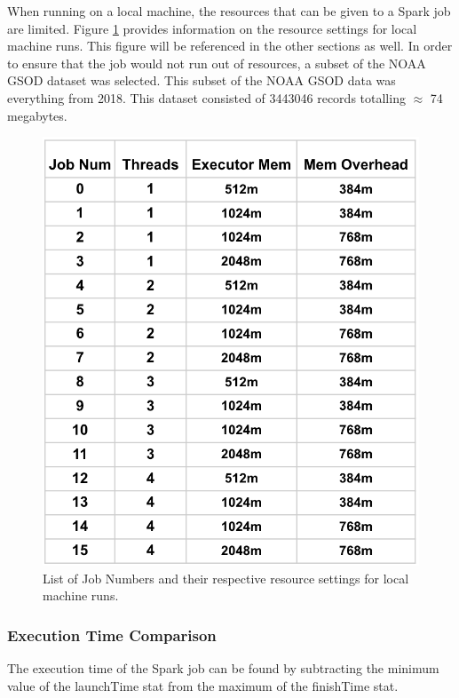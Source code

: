 \documentclass[conference]{IEEEtran}
\begin{document}
When running on a local machine, the resources that can be given to a Spark job are limited.
Figure \ref{fig:localjobs} provides information on the resource settings for local machine runs.
This figure will be referenced in the other sections as well.
In order to ensure that the job would not run out of resources, a subset of the NOAA GSOD dataset was selected.
This subset of the NOAA GSOD data was everything from 2018.
This dataset consisted of 3443046 records totalling $\approx$ 74 megabytes.

\begin{figure}
    \includegraphics[width=\linewidth]{presentation_table.PNG}
    \caption{List of Job Numbers and their respective resource settings for local machine runs.}
    \label{fig:localjobs}
\end{figure}

\subsubsection{Execution Time Comparison}
The execution time of the Spark job can be found by subtracting the minimum value of the launchTime stat from the maximum of the finishTime stat.
\end{document}

